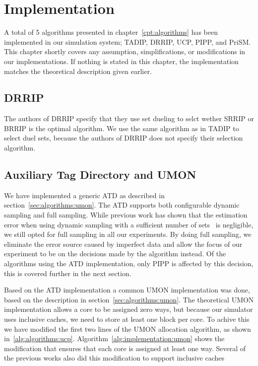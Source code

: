 \chapter{Implementation}
\label{cpt:implementation}

A total of 5 algorithms presented in chapter~\ref{cpt:algorithms} has been implemented in our simulation system; TADIP, DRRIP, UCP, PIPP, and PriSM.
This chapter shortly covers any assumption, simplifications, or modifications in our implementations.
If nothing is stated in this chapter, the implementation matches the theoretical description given earlier.

\section{DRRIP}
The authors of DRRIP specify that they use set dueling to selct wether SRRIP or BRRIP is the optimal algorithm.
We use the same algorithm as in TADIP to select duel sets, because the authors of DRRIP does not specify their selection algorithm.

\section{Auxiliary Tag Directory and UMON}

We have implemented a generic ATD as described in section~\ref{sec:algorithms:umon}.
The ATD supports both configurable dynamic sampling and full sampling.
While previous work has shown that the estimation error when using dynamic sampling with a sufficient number of sets~\cite{} is negligible, we still opted for full sampling in all our experiments.
By doing full sampling, we eliminate the error source caused by imperfect data and allow the focus of our experiment to be on the decisions made by the algorithm instead.
Of the algorithms using the ATD implementation, only PIPP is affected by this decision, this is covered further in the next section.

Based on the ATD implementation a common UMON implementation was done, based on the description in section~\ref{sec:algorithms:umon}.
The theoretical UMON implementation allows a core to be assigned zero ways, but because our simulator uses inclusive caches, we need to store at least one block per core.
To achive this we have modified the first two lines of the UMON allocation algorithm, as shown in~\ref{alg:algorithms:ucp}.
Algorithm~\ref{alg:implementation:umon} shows the modification that ensures that each core is assigned at least one way.
Several of the previous works also did this modification to support inclusive caches~\cite{Qureshi2006,Xie2009}

